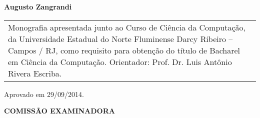  
\begin{folhadeaprovacao}
  \thispagestyle{empty}
  \center
  \textbf{Augusto Zangrandi}
  \vfill

  \center{\textbf{\Large{\textit{\titulo}}}}

  \hspace*{2cm}
  \begin{table}[h!]
    \raggedleft
    \begin{tabular}{p{7cm}}
    Monografia apresentada junto ao Curso de Ciência da Computação, da Universidade Estadual do Norte Fluminense Darcy Ribeiro – Campos / RJ, como requisito para obtenção do título de Bacharel em Ciência da Computação.
    Orientador: Prof. Dr. Luis Antônio Rivera Escriba.
    \end{tabular}
  \end{table}

  \hspace*{2cm}
  \raggedright Aprovado em 29/09/2014.

  \center
  \textbf{COMISSÃO EXAMINADORA}

  \setlength{\ABNTsignthickness}{0.4pt} \setlength{\ABNTsignskip}{1.7cm}

\end{folhadeaprovacao}